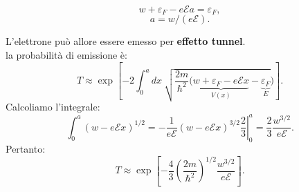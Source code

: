 \begin{minipage}{.5\textwidth}
\begin{equation}
w+\varepsilon _F-e\mathscr{E}a=\varepsilon _F ,
\end{equation}
\begin{equation}
a= w/(e\mathscr{E}) .
\end{equation}
\end{minipage}
L'elettrone può allore essere emesso per \textbf{effetto tunnel}.\\
la probabilità di emissione è:
\begin{equation}
T \approx \exp \left[-2 \int_{0} ^{a} dx\ \sqrt{\frac{2m}{\hbar ^2} (\underbrace{w+\varepsilon _F-e\mathscr{E}x}_{V(x)}-\underbrace{\varepsilon _F}_{E}})\right].
\end{equation}
Calcoliamo l'integrale:
\begin{equation}
\int _{0} ^{a} \left( w-e\mathscr{E}x \right) ^{1/2}= \left. -\frac{1}{e\mathscr{E}}\left( w-e\mathscr{E}x \right) ^{3/2}\frac{2}{3}\right| _0 ^a =\frac{2}{3}\frac{w^{3/2}}{e\mathscr{E}}.
\end{equation}
Pertanto:
\begin{equation}
T \approx \exp \left[-\frac{4}{3}\left(\frac{2m}{\hbar ^2}\right)^{1/2}\frac{w^{3/2}}{e\mathscr{E}}\right].
\end{equation}
